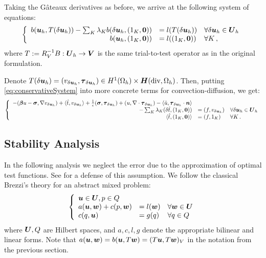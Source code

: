 \documentclass[Proposal.tex]{subfiles}
\begin{document}
Taking the G\^ateaux derivatives as before, we arrive at the following system
of equations:
\begin{equation}
\left\{
\begin{array}[c]{rll}
b(\boldsymbol{u}_h,T(\delta\boldsymbol{u}_h))-\sum_K\lambda_K b(\delta\boldsymbol{u}_h,(1_K,\boldsymbol{0}))
&=l(T(\delta\boldsymbol{u}_h)) & \forall\delta\boldsymbol{u}_h\in\boldsymbol{U}_h\\
b(\boldsymbol{u}_h,(1_K,\boldsymbol{0})) &=l((1_K,\boldsymbol{0})) & \forall K\,,
\end{array}
\right.
\label{eq:conservativeSystem}
\end{equation}
where $T:=R_V^{-1}B:\boldsymbol{U}_h\rightarrow\boldsymbol{V}$ is the same trial-to-test operator as in the original formulation.

Denote $T(\delta\boldsymbol u_h)=\left( v_{\delta\boldsymbol{u}_h},\boldsymbol\tau_{\delta\boldsymbol{u}_h} \right)\in
H^1(\Omega_h)\times\mbox{\boldmath $H$}(\text{div},\Omega_h)$.
Then, putting \eqref{eq:conservativeSystem} into more concrete terms for
convection-diffusion, we get:
\begin{equation}
\left\{
\begin{array}[c]{rll}
-(\boldsymbol\beta u-\boldsymbol\sigma,\nabla v_{\delta\boldsymbol{u}_h})+\langle\hat t,v_{\delta\boldsymbol{u}_h}\rangle
+ \frac{1}{\epsilon}(\boldsymbol\sigma,\boldsymbol\tau_{\delta\boldsymbol{u}_h})
+(u,\nabla\cdot\boldsymbol\tau_{\delta\boldsymbol{u}_h})
-\langle\hat u,\boldsymbol\tau_{\delta\boldsymbol{u}_h}\cdot\boldsymbol{n}\rangle\\
-\sum_K\lambda_K (\delta\hat t,(1_K,\boldsymbol{0}))
&=(f,v_{\delta\boldsymbol{u}_h}) & \forall\delta\boldsymbol{u}_h\in\boldsymbol{U}_h\\
\langle\hat t,(1_K,\boldsymbol{0})\rangle &=(f,1_K) & \forall K\,.
\end{array}
\right.
\label{eq:conservativeConfusionSystem}
\end{equation}

\subsection{Stability Analysis}

In the following analysis we neglect the error due to the approximation of optimal test functions.
See \cite{practicalDPG} for a defense of this assumption.
We follow the classical Brezzi's theory \cite{Brezzi1974,BabuskaBrezziReport} for an abstract
mixed problem:
\begin{equation}
\left\{
\begin{array}{lll}
\boldsymbol u \in \boldsymbol U, p \in Q\\
a(\boldsymbol u,\boldsymbol w) + c(p,\boldsymbol w) & = l(\boldsymbol w) & \forall \boldsymbol w \in \boldsymbol U \\
c(q,\boldsymbol u) & = g(q) & \forall q \in Q
\end{array}
\right.
\end{equation}
where $\boldsymbol U,Q$ are Hilbert spaces, and $a,c,l,g$ denote the appropriate
bilinear and linear forms. Note that $a(\boldsymbol u,\boldsymbol w)=b(\boldsymbol u,T\boldsymbol w)=(T\boldsymbol u,T\boldsymbol w)_V$ in
the notation from the previous section.
\end{document}
